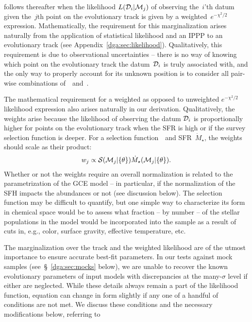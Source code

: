 follows thereafter when the likelihood $L(\mathcal{D}_i | \mathcal{M}_j)$ of
observing the~$i$'th datum given the~$j$th point on the evolutionary track is
given by a weighted~$e^{-\chi^2/2}$ expression.
Mathematically, the requirement for this marginalization arises naturally from
the application of statistical likelihood and an IPPP to an evolutionary track
(see Appendix~\ref{dga:sec:likelihood}).
Qualitatively, this requirement is due to observational uncertainties -- there
is no way of knowing which point on the evolutionary track the
datum~$\mathcal{D}_i$ is truly associated with, and the only way to properly
account for its unknown position is to consider all pair-wise combinations
of~~and~.
\par
The mathematical requirement for a weighted as opposed to unweighted
$e^{-\chi^2/2}$ likelihood expression also arises naturally in our derivation.
Qualitatively, the weights arise because the likelihood of observing the datum
$\mathcal{D}_i$ is proportionally higher for points on the evolutionary track
when the SFR is high or if the survey selection function is deeper.
For a selection function~~and SFR~$\dot{M}_\star$, the weights should
scale as their product:
\begin{equation}
w_j \propto \mathcal{S}(\mathcal{M}_j | \{\theta\})
\dot{M}_\star(\mathcal{M}_j | \{\theta\}).
\label{dga:eq:weights}
\end{equation}
Whether or not the weights require an overall normalization is related to the
parametrization of the GCE model -- in particular, if the normalization of the
SFH impacts the abundances or not (see discussion below).
The selection function may be difficult to quantify, but one simple way to
characterize its form in chemical space would be to assess what fraction -- by
number -- of the stellar populations in the model would be incorporated into
the sample as a result of cuts in, e.g., color, surface gravity, effective
temperature, etc.
\par
The marginalization over the track and the weighted likelihood are of the
utmost importance to ensure accurate best-fit parameters.
In our tests against mock samples (see~\S~\ref{dga:sec:mocks} below), we are unable
to recover the known evolutionary parameters of input models with discrepancies
at the many-$\sigma$ level if either are neglected.
While these details always remain a part of the likelihood function, equation
 can change in form slightly if any one of a handful of
conditions are not met.
We discuss these conditions and the necessary modifications below, referring to
